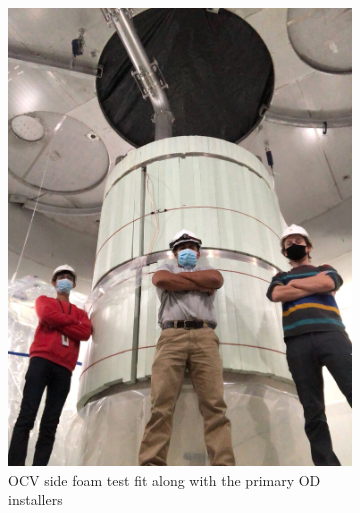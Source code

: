 \begin{figure}[]
  \begin{subfigure}{.5\textwidth}
  \centering
  \includegraphics[width=\linewidth]{Figures/Construction/SAT_foam_fittest.jpg}
  \caption{OCV side foam test fit along with the primary OD installers}
  \label{fig:sat_foam_fit_test}
  \end{subfigure}
  \begin{subfigure}{.5\textwidth}
  \centering

\end{subfigure}
\end{figure}
